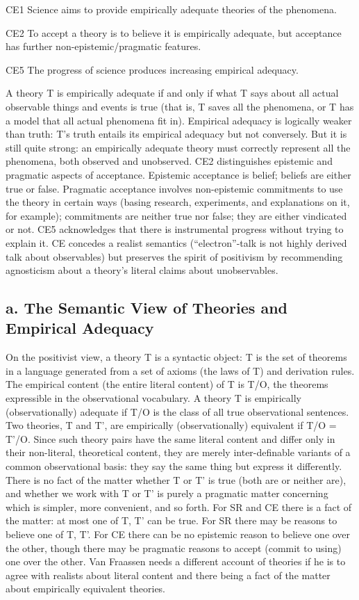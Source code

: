 CE1     Science aims to provide empirically adequate theories of the phenomena.

CE2     To accept a theory is to believe it is empirically adequate, but acceptance has further non-epistemic/pragmatic features.

CE5     The progress of science produces increasing empirical adequacy.

A theory T is empirically adequate if and only if what T says about all actual
observable things and events is true (that is, T saves all the phenomena, or T
has a model that all actual phenomena fit in). Empirical adequacy is logically
weaker than truth: T’s truth entails its empirical adequacy but not conversely.
But it is still quite strong: an empirically adequate theory must correctly
represent all the phenomena, both observed and unobserved. CE2 distinguishes
epistemic and pragmatic aspects of acceptance. Epistemic acceptance is belief;
beliefs are either true or false. Pragmatic acceptance involves non-epistemic
commitments to use the theory in certain ways (basing research, experiments,
and explanations on it, for example); commitments are neither true nor false;
they are either vindicated or not. CE5 acknowledges that there is instrumental
progress without trying to explain it. CE concedes a realist semantics
(“electron”-talk is not highly derived talk about observables) but preserves
the spirit of positivism by recommending agnosticism about a theory’s literal
claims about unobservables.

\subsection{a. The Semantic View of Theories and Empirical Adequacy}

On the positivist view, a theory T is a syntactic object: T is the set of
theorems in a language generated from a set of axioms (the laws of T) and
derivation rules. The empirical content (the entire literal content) of T is
T/O, the theorems expressible in the observational vocabulary. A theory T is
empirically (observationally) adequate if T/O is the class of all true
observational sentences.  Two theories, T and T’, are empirically
(observationally) equivalent if T/O = T’/O. Since such theory pairs have the
same literal content and differ only in their non-literal, theoretical content,
they are merely inter-definable variants of a common observational basis: they
say the same thing but express it differently. There is no fact of the matter
whether T or T’ is true (both are or neither are), and whether we work with T
or T’ is purely a pragmatic matter concerning which is simpler, more
convenient, and so forth. For SR and CE there is a fact of the matter: at most
one of T, T’ can be true. For SR there may be reasons to believe one of T, T’.
For CE there can be no epistemic reason to believe one over the other, though
there may be pragmatic reasons to accept (commit to using) one over the other.
Van Fraassen needs a different account of theories if he is to agree with
realists about literal content and there being a fact of the matter about
empirically equivalent theories.

